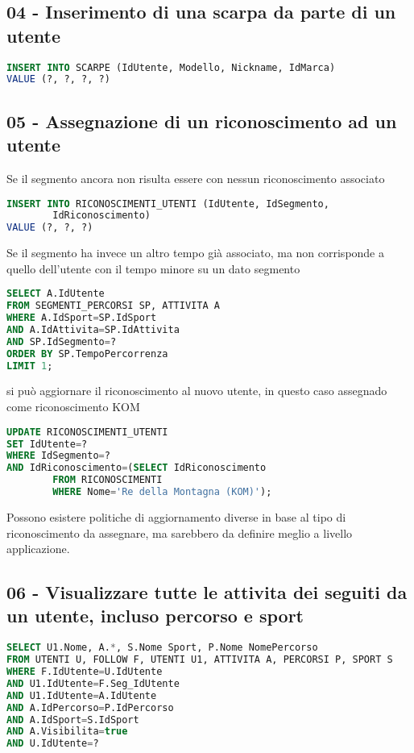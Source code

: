 \documentclass[12pt]{report}
\begin{document}
\subsection*{04 - Inserimento di una scarpa da parte di un utente}

\begin{lstlisting}[style=sql, language=SQL, label=lst:sql-query]
INSERT INTO SCARPE (IdUtente, Modello, Nickname, IdMarca)
VALUE (?, ?, ?, ?)
\end{lstlisting}


\subsection*{05 - Assegnazione di un riconoscimento ad un utente}
Se il segmento ancora non risulta essere con nessun riconoscimento associato

\begin{lstlisting}[style=sql, language=SQL, label=lst:sql-query]
INSERT INTO RICONOSCIMENTI_UTENTI (IdUtente, IdSegmento, 
        IdRiconoscimento)
VALUE (?, ?, ?)
\end{lstlisting}

Se il segmento ha invece un altro tempo già associato, ma non corrisponde
a quello dell'utente con il tempo minore su un dato segmento
\begin{lstlisting}[style=sql, language=SQL, label=lst:sql-query]
SELECT A.IdUtente
FROM SEGMENTI_PERCORSI SP, ATTIVITA A
WHERE A.IdSport=SP.IdSport
AND A.IdAttivita=SP.IdAttivita
AND SP.IdSegmento=?
ORDER BY SP.TempoPercorrenza
LIMIT 1;
\end{lstlisting}

si può aggiornare il riconoscimento al nuovo utente, in questo caso 
assegnado come riconoscimento KOM
\begin{lstlisting}[style=sql, language=SQL, label=lst:sql-query]
UPDATE RICONOSCIMENTI_UTENTI
SET IdUtente=?
WHERE IdSegmento=?
AND IdRiconoscimento=(SELECT IdRiconoscimento
        FROM RICONOSCIMENTI
        WHERE Nome='Re della Montagna (KOM)');
\end{lstlisting}

Possono esistere politiche di aggiornamento diverse in base al tipo di riconoscimento da assegnare,
ma sarebbero da definire meglio a livello applicazione.

\subsection*{06 - Visualizzare tutte le attivita dei seguiti da un utente, incluso percorso e sport}
\begin{lstlisting}[style=sql, language=SQL, label=lst:sql-query]
SELECT U1.Nome, A.*, S.Nome Sport, P.Nome NomePercorso
FROM UTENTI U, FOLLOW F, UTENTI U1, ATTIVITA A, PERCORSI P, SPORT S
WHERE F.IdUtente=U.IdUtente
AND U1.IdUtente=F.Seg_IdUtente
AND U1.IdUtente=A.IdUtente
AND A.IdPercorso=P.IdPercorso
AND A.IdSport=S.IdSport
AND A.Visibilita=true
AND U.IdUtente=?
\end{lstlisting}
\end{document}
